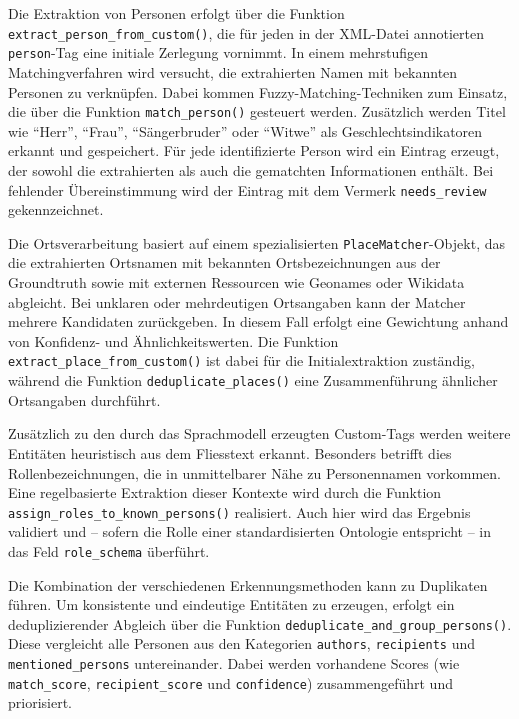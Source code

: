\documentclass[12pt, a4paper, ngerman, bidi=default]{article}
\newcommand{\code}[1]{\colorbox{VeryLightGray}{\texttt{#1}}} %
\begin{document}
Die Extraktion von Personen erfolgt über die Funktion \code{extract\_person\_from\_custom()}, die für jeden in der XML-Datei 
annotierten \code{person}-Tag eine initiale Zerlegung vornimmt. In einem mehrstufigen Matchingverfahren wird versucht, die 
extrahierten Namen mit bekannten Personen zu verknüpfen. Dabei kommen Fuzzy-Matching-Techniken zum Einsatz, die über die Funktion 
\code{match\_person()} gesteuert werden. Zusätzlich werden Titel wie \enquote{Herr}, \enquote{Frau}, \enquote{Sängerbruder} oder 
\enquote{Witwe} als Geschlechtsindikatoren erkannt und gespeichert. Für jede identifizierte Person wird ein Eintrag erzeugt, der sowohl 
die extrahierten als auch die gematchten Informationen enthält. Bei fehlender Übereinstimmung wird der Eintrag mit dem Vermerk 
\code{needs\_review} gekennzeichnet.

Die Ortsverarbeitung basiert auf einem spezialisierten \code{PlaceMatcher}-Objekt, das die extrahierten Ortsnamen mit bekannten 
Ortsbezeichnungen aus der Groundtruth sowie mit externen Ressourcen wie Geonames oder Wikidata abgleicht. Bei unklaren oder 
mehrdeutigen Ortsangaben kann der Matcher mehrere Kandidaten zurückgeben. In diesem Fall erfolgt eine Gewichtung anhand von 
Konfidenz- und Ähnlichkeitswerten. Die Funktion \code{extract\_place\_from\_custom()} ist dabei für die Initialextraktion 
zuständig, während die Funktion \code{deduplicate\_places()} eine Zusammenführung ähnlicher Ortsangaben durchführt.

Zusätzlich zu den durch das Sprachmodell erzeugten Custom-Tags werden weitere Entitäten heuristisch aus dem Fliesstext erkannt. 
Besonders betrifft dies Rollenbezeichnungen, die in unmittelbarer Nähe zu Personennamen vorkommen. Eine regelbasierte Extraktion 
dieser Kontexte wird durch die Funktion \code{assign\_roles\_to\_known\_persons()} realisiert. Auch hier wird das Ergebnis validiert 
und – sofern die Rolle einer standardisierten Ontologie entspricht – in das Feld \code{role\_schema} überführt.

Die Kombination der verschiedenen Erkennungsmethoden kann zu Duplikaten führen. Um konsistente und eindeutige Entitäten zu erzeugen, 
erfolgt ein deduplizierender Abgleich über die Funktion \code{deduplicate\_and\_group\_persons()}. Diese vergleicht alle Personen 
aus den Kategorien \code{authors}, \code{recipients} und \code{mentioned\_persons} untereinander. Dabei werden vorhandene Scores 
(wie \code{match\_score}, \code{recipient\_score} und \code{confidence}) zusammengeführt und priorisiert.
\end{document}

